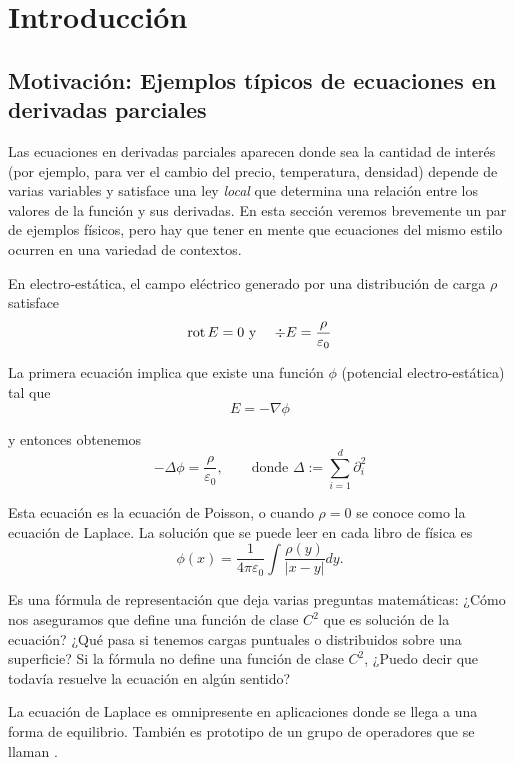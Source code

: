 \chapter{Introducción}

\section{Motivación: Ejemplos típicos de ecuaciones en derivadas parciales}

Las ecuaciones en derivadas parciales aparecen donde sea la cantidad de interés (por ejemplo, para ver el cambio del precio, temperatura, densidad) depende de varias variables y satisface una ley \textit{local} que determina una relación entre los valores de la función y sus derivadas. En esta sección veremos brevemente un par de ejemplos físicos, pero hay que tener en mente que ecuaciones del mismo estilo ocurren en una variedad de contextos.

\begin{example}

En electro-estática, el campo eléctrico generado por una distribución de carga $\rho$ satisface
\begin{eqnarray}
    \operatorname{rot} E = 0 & \mbox{ y } & \div E = \frac{\rho}{\varepsilon_0}
\end{eqnarray}

La primera ecuación implica que existe una función $\phi$ (potencial electro-estática) tal que
\begin{equation}
    E = - \nabla \phi
\end{equation}

y entonces obtenemos
\begin{equation}
    - \Delta \phi = \frac{\rho}{\varepsilon_0}, \qquad \mbox{donde } \Delta := \sum_{i=1}^{d} \partial_{i}^2
\end{equation}

Esta ecuación es la ecuación de Poisson, o cuando $\rho = 0$ se conoce como la ecuación de Laplace. La solución que se puede leer en cada libro de física es
\begin{equation}
    \phi(x) = \frac{1}{4\pi\varepsilon_0} \int \frac{\rho (y)}{|x-y|} dy.
\end{equation}

Es una fórmula de representación que deja varias preguntas matemáticas: ¿Cómo nos aseguramos que define una función de clase $C^2$ que es solución de la ecuación? ¿Qué pasa si tenemos cargas puntuales o distribuidos sobre una superficie? Si la fórmula no define una función de clase $C^2$, ¿Puedo decir que todavía resuelve la ecuación en algún sentido?

La ecuación de Laplace es omnipresente en aplicaciones donde se llega a una forma de equilibrio. También es prototipo de un grupo de operadores que se llaman .

\end{example}

